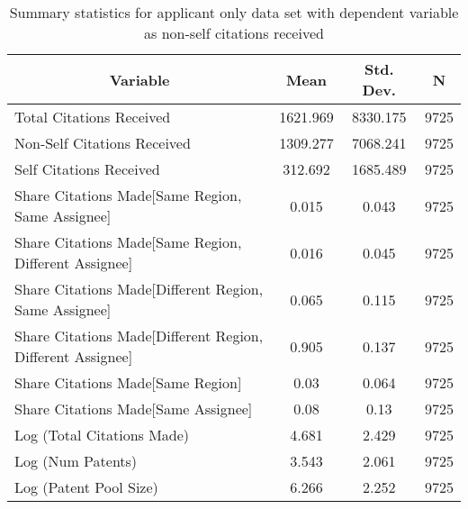 
\begin{table}[htbp]\centering \caption{Summary statistics for applicant only data set with dependent variable as non-self citations received  \label{a.nsummary}}
\begin{tabular}{l c c  c}\hline\hline
\multicolumn{1}{c}{\textbf{Variable}} & \textbf{Mean}
 & \textbf{Std. Dev.} & \textbf{N}\\ \hline
Total Citations Received & 1621.969 & 8330.175  & 9725\\
Non-Self Citations Received & 1309.277 & 7068.241  & 9725\\
Self Citations Received & 312.692 & 1685.489  & 9725\\
Share Citations Made[Same Region, Same Assignee] & 0.015 & 0.043  & 9725\\
Share Citations Made[Same Region, Different Assignee] & 0.016 & 0.045  & 9725\\
Share Citations Made[Different Region, Same Assignee] & 0.065 & 0.115  & 9725\\
Share Citations Made[Different Region, Different Assignee] & 0.905 & 0.137  & 9725\\
Share Citations Made[Same Region] & 0.03 & 0.064  & 9725\\
Share Citations Made[Same Assignee] & 0.08 & 0.13  & 9725\\
Log (Total Citations Made) & 4.681 & 2.429  & 9725\\
Log (Num Patents) & 3.543 & 2.061  & 9725\\
Log (Patent Pool Size) & 6.266 & 2.252  & 9725\\
\hline\end{tabular}
\end{table}
